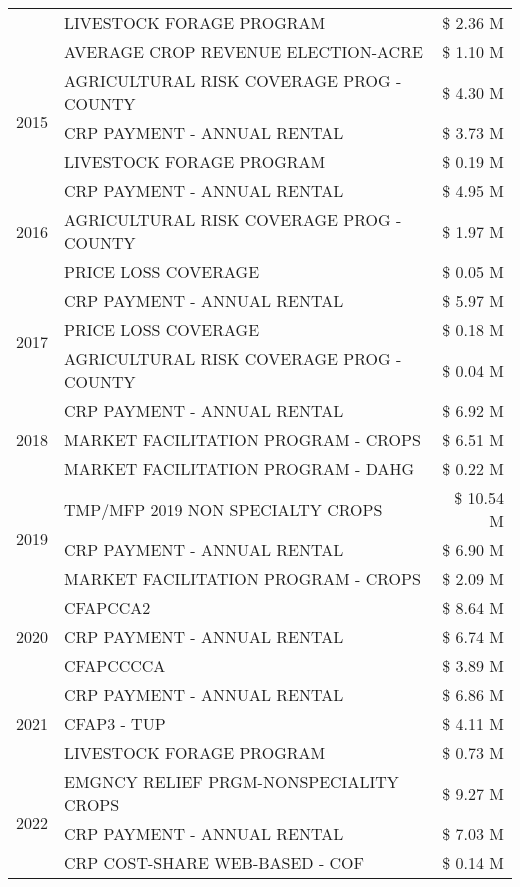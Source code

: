 \begin{tabular}{llr}
 & LIVESTOCK FORAGE PROGRAM & \$ 2.36 M \\
 & AVERAGE CROP REVENUE ELECTION-ACRE & \$ 1.10 M \\
\cline{1-3}
\multirow[t]{3}{*}{2015} & AGRICULTURAL RISK COVERAGE PROG - COUNTY & \$ 4.30 M \\
 & CRP PAYMENT - ANNUAL RENTAL & \$ 3.73 M \\
 & LIVESTOCK FORAGE PROGRAM & \$ 0.19 M \\
\cline{1-3}
\multirow[t]{3}{*}{2016} & CRP PAYMENT - ANNUAL RENTAL & \$ 4.95 M \\
 & AGRICULTURAL RISK COVERAGE PROG - COUNTY & \$ 1.97 M \\
 & PRICE LOSS COVERAGE & \$ 0.05 M \\
\cline{1-3}
\multirow[t]{3}{*}{2017} & CRP PAYMENT - ANNUAL RENTAL & \$ 5.97 M \\
 & PRICE LOSS COVERAGE & \$ 0.18 M \\
 & AGRICULTURAL RISK COVERAGE PROG - COUNTY & \$ 0.04 M \\
\cline{1-3}
\multirow[t]{3}{*}{2018} & CRP PAYMENT - ANNUAL RENTAL & \$ 6.92 M \\
 & MARKET FACILITATION PROGRAM - CROPS & \$ 6.51 M \\
 & MARKET FACILITATION PROGRAM - DAHG & \$ 0.22 M \\
\cline{1-3}
\multirow[t]{3}{*}{2019} & TMP/MFP 2019 NON SPECIALTY CROPS & \$ 10.54 M \\
 & CRP PAYMENT - ANNUAL RENTAL & \$ 6.90 M \\
 & MARKET FACILITATION PROGRAM - CROPS & \$ 2.09 M \\
\cline{1-3}
\multirow[t]{3}{*}{2020} & CFAPCCA2 & \$ 8.64 M \\
 & CRP PAYMENT - ANNUAL RENTAL & \$ 6.74 M \\
 & CFAPCCCCA & \$ 3.89 M \\
\cline{1-3}
\multirow[t]{3}{*}{2021} & CRP PAYMENT - ANNUAL RENTAL & \$ 6.86 M \\
 & CFAP3 - TUP & \$ 4.11 M \\
 & LIVESTOCK FORAGE PROGRAM & \$ 0.73 M \\
\cline{1-3}
\multirow[t]{3}{*}{2022} & EMGNCY RELIEF PRGM-NONSPECIALITY CROPS & \$ 9.27 M \\
 & CRP PAYMENT - ANNUAL RENTAL & \$ 7.03 M \\
 & CRP COST-SHARE WEB-BASED - COF & \$ 0.14 M \\
\cline{1-3}
\bottomrule
\end{tabular}
